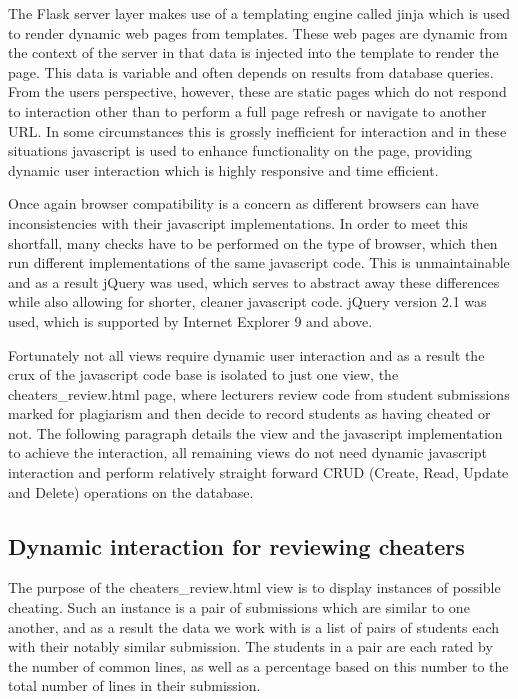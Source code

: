 \documentclass[11pt,a4paper]{article}
\begin{document}
The Flask server layer makes use of a templating engine called jinja which is used to render dynamic web pages from templates. These web pages are dynamic from the context of the server in that data is injected into the template to render the page. This data is variable and often depends on results from database queries. From the users perspective, however, these are static pages which do not respond to interaction other than to perform a full page refresh or navigate to another URL. In some circumstances this is grossly inefficient for interaction and in these situations javascript is used to enhance functionality on the page, providing dynamic user interaction which is highly responsive and time efficient.

Once again browser compatibility is a concern as different browsers can have inconsistencies with their javascript implementations. In order to meet this shortfall, many checks have to be performed on the type of browser, which then run different implementations of the same javascript code. This is unmaintainable and as a result jQuery was used, which serves to abstract away these differences while also allowing for shorter, cleaner javascript code. jQuery version 2.1 was used, which is supported by Internet Explorer 9 and above.

Fortunately not all views require dynamic user interaction and as a result the
crux of the javascript code base is isolated to just one view, the cheaters\_review.html page, where lecturers review code from student submissions marked for plagiarism and then decide to record students as having cheated or not. The following paragraph details the view and the javascript implementation to achieve the interaction, all remaining views do not need dynamic javascript interaction and perform relatively straight forward CRUD (Create, Read, Update and Delete) operations on the database.

\subsection{Dynamic interaction for reviewing cheaters}

The purpose of the cheaters\_review.html view is to display instances of possible cheating. Such an instance is a pair of submissions which are similar to one another, and as a result the data we work with is a list of pairs of students each with their notably similar submission. The students in a pair are each rated by the number of common lines, as well as a percentage based on this number to the total number of lines in their submission.
\end{document}

